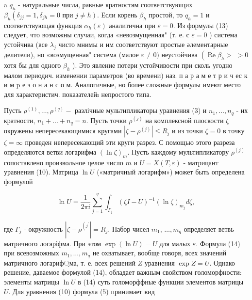 \documentclass[10pt]{article}
\begin{document}
a $q_{h}$ - натуральные числа, равные кратностям соответствующих $\beta_{h}\left(\delta_{j j}=1, \delta_{j h}=0\right.$ при $\left.j \neq h\right)$. Если корень $\beta_{h}$ простой, то $q_{h}=1$ и соответствующая функция $\alpha_{h}(\varepsilon)$ аналитична при $\varepsilon=0$. Из формулы (13) следует, что возможны случаи, когда «невозмущенная" (т. е. с $\varepsilon=0$ ) система устойчива (все $\lambda_{j}$ чисто мнимы и им соответствуют простые әлементарные делители), но «возмущенная" система (малое $\varepsilon \neq 0)$ неустойчива $\left(\operatorname{Re} \beta_{h}>\right.$ $>0$ хотя бы для одного $\beta_{h}$ ). Это явление потери устойчивости при сколь угодно малом периодич. изменении параметров (во времени) наз. п а р а м е т р и ч ес к и м p е з о н а н с о м. Аналогичные, но более сложные формулы имеют место для характеристич. показателейı непростого типа.



Пусть $\rho^{(1)}, \ldots, \rho^{(q)}-$ разлічные мультипликаторы уравнения (3) и $n_{1}, \ldots, n_{q}$ - их кратности, $n_{1}+\ldots+n_{q}=n$. Пусть точки $\rho^{(j)}$ на комплексной плоскости $\zeta$ окружены непересекающимися кругами $\left|\zeta-\rho^{(j)}\right| \leqslant R_{j}$ и из точки $\zeta=0$ в точку $\zeta=\infty$ проведен непересекающий эти круги разрез. С помощью этого разреза определяются ветви логарифма $(\ln \zeta)_{m}$. Пусть каждому мультипликатору $\rho^{(j)}$ сопоставлено произвольное целое число $m$ и $U=X(T, \varepsilon)$ - матрицант уравнения (10). Матрица $\ln U$ («матричный логарифм») может быть определена формулой



\[

\ln U=\frac{1}{2 \pi i} \sum_{j=1}^{q} \int_{\Gamma_{j}}(\zeta I-U)^{-1}(\ln \zeta)_{m_{j}} d \zeta,

\]



где $\Gamma_{j}$ - окружность $\left|\zeta-\rho^{\left(j^{\prime}\right.}\right|=R_{j}$. Набор чисел $m_{1}$, $\ldots, m_{q}$ определяет ветвь матричного логаріфма. При этом $\exp (\ln U)=U$ для малых $\varepsilon$. Формула (14) при всевозможных $m_{1}, \ldots, m_{q}$ не охватывает, вообще говоря, всех значений матричного логариф্ма, т. е. всех решений $Z$ уравнения $\exp Z=U$. Однако решение, даваемое формулой (14), обладает важным свойством голоморфности: элементы матрицы $\ln U$ в (14) суть голоморффные функции элементов матрицы $U$. Для уравнения (10) формула (5) принимает вид
\end{document}
